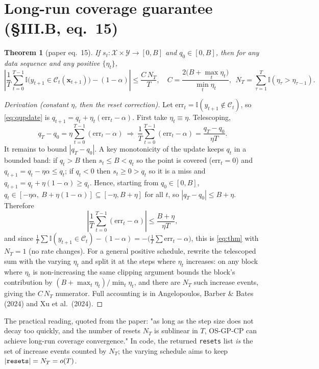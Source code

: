 \documentclass[11pt]{article}
\theoremstyle{plain}
\newtheorem{theorem}{Theorem}
\theoremstyle{definition}
\newcommand{\C}{\mathcal{C}}
\newcommand{\x}{\mathbf{x}}
\newcommand{\indic}{\mathbb{I}}
\newcommand{\code}[1]{\texttt{#1}}
\begin{document}
\section{Long-run coverage guarantee (\S III.B, eq.~15)}\label{sec:theorem}
\begin{theorem}[paper eq.~15]\label{thm:cov}
If $s_t:\mathcal X\times\mathcal Y\to[0,B]$ and $q_0\in[0,B]$, then for any data sequence and any positive $\{\eta_t\}$,
\begin{equation}
\left|\frac1T\sum_{t=0}^{T-1}\indic\big(y_{t+1}\in\C_t(\x_{t+1})\big)-(1-\alpha)\right|\le\frac{C\,N_T}{T},\quad
C=\frac{2\big(B+\max_t\eta_t\big)}{\min_t\eta_t},\ \ N_T=\sum_{\tau=1}^{T}\indic(\eta_\tau>\eta_{\tau-1}).
\label{eq:thm}
\end{equation}
\end{theorem}
\begin{proof}[Derivation (constant $\eta$, then the reset correction)]
Let $\mathrm{err}_t=\indic(y_{t+1}\notin\C_t)$, so \eqref{eq:qupdate} is $q_{t+1}=q_t+\eta_t(\mathrm{err}_t-\alpha)$. First take $\eta_t\equiv\eta$. Telescoping,
\[
q_T-q_0=\eta\sum_{t=0}^{T-1}(\mathrm{err}_t-\alpha)\ \Longrightarrow\ \frac1T\sum_{t=0}^{T-1}(\mathrm{err}_t-\alpha)=\frac{q_T-q_0}{\eta T}.
\]
It remains to bound $|q_T-q_0|$. A key monotonicity of the update keeps $q_t$ in a bounded band: if $q_t>B$ then $s_t\le B<q_t$ so the point is covered ($\mathrm{err}_t=0$) and $q_{t+1}=q_t-\eta\alpha\le q_t$; if $q_t<0$ then $s_t\ge0>q_t$ so it is a miss and $q_{t+1}=q_t+\eta(1-\alpha)\ge q_t$. Hence, starting from $q_0\in[0,B]$, $q_t\in[-\eta\alpha,\ B+\eta(1-\alpha)]\subseteq[-\eta,B+\eta]$ for all $t$, so $|q_T-q_0|\le B+\eta$. Therefore
\[
\left|\frac1T\sum_{t=0}^{T-1}(\mathrm{err}_t-\alpha)\right|\le\frac{B+\eta}{\eta T},
\]
and since $\frac1T\sum\indic(y_{t+1}\in\C_t)-(1-\alpha)=-\big(\frac1T\sum\mathrm{err}_t-\alpha\big)$, this is \eqref{eq:thm} with $N_T=1$ (no rate changes). For a general positive schedule, rewrite the telescoped sum with the varying $\eta_t$ and split it at the steps where $\eta_t$ increases: on any block where $\eta_t$ is non-increasing the same clipping argument bounds the block's contribution by $(B+\max_t\eta_t)/\min_t\eta_t$, and there are $N_T$ such increase events, giving the $C\,N_T$ numerator. Full accounting is in Angelopoulos, Barber \& Bates (2024) and Xu et al.\ (2024).
\end{proof}
\noindent The practical reading, quoted from the paper: "as long as the step size does not decay too quickly, and the number of resets $N_T$ is sublinear in $T$, OS-GP-CP can achieve long-run coverage convergence." In code, the returned \code{resets} list \emph{is} the set of increase events counted by $N_T$; the varying schedule aims to keep $|\text{\code{resets}}|=N_T=o(T)$.
\end{document}
